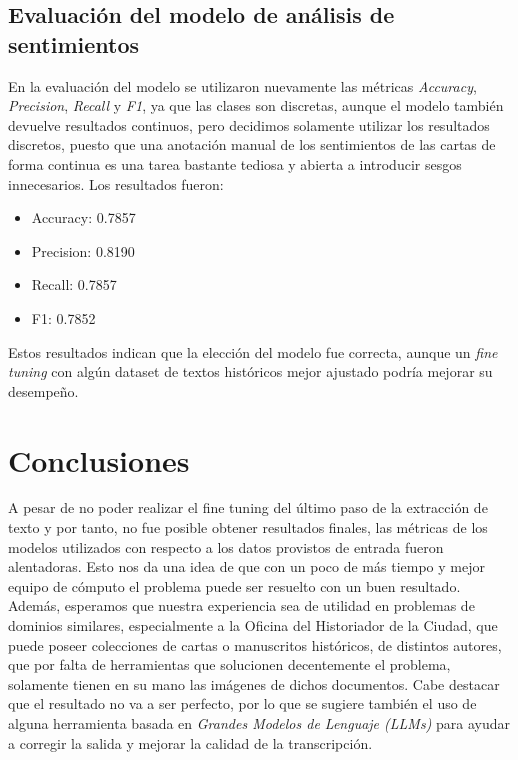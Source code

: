 \documentclass[11pt,a4paper]{article}
\begin{document}
\subsection{Evaluación del modelo de análisis de sentimientos}
En la evaluación del modelo se utilizaron nuevamente las métricas \textit{Accuracy}, \textit{Precision}, \textit{Recall} y \textit{F1}, ya que las clases son discretas, aunque el modelo también devuelve resultados continuos, pero decidimos solamente utilizar los resultados discretos, puesto que una anotación manual de los sentimientos de las cartas de forma continua es una tarea bastante tediosa y abierta a introducir sesgos innecesarios. 
Los resultados fueron:

\begin{itemize}
    \item Accuracy: 0.7857
    \item Precision: 0.8190
    \item Recall: 0.7857
    \item F1: 0.7852
\end{itemize}

Estos resultados indican que la elección del modelo fue correcta, aunque un \textit{fine tuning} con algún dataset de textos históricos mejor ajustado podría mejorar su desempeño.

\section{Conclusiones}
A pesar de no poder realizar el fine tuning del último paso de la extracción de texto y por tanto, no fue posible obtener resultados finales, las métricas de los modelos utilizados con respecto a los datos provistos de entrada fueron alentadoras. 
Esto nos da una idea de que con un poco de más tiempo y mejor equipo de cómputo el problema puede ser resuelto con un buen resultado. 
Además, esperamos que nuestra experiencia sea de utilidad en problemas de dominios similares, especialmente a la Oficina del Historiador de la Ciudad, que puede poseer colecciones de cartas o manuscritos históricos, de distintos autores, que por falta de herramientas que solucionen decentemente el problema, solamente tienen en su mano las imágenes de dichos documentos. 
Cabe destacar que el resultado no va a ser perfecto, por lo que se sugiere también el uso de alguna herramienta basada en \textit{Grandes Modelos de Lenguaje (LLMs)} para ayudar a corregir la salida y mejorar la calidad de la transcripción.
\end{document}
